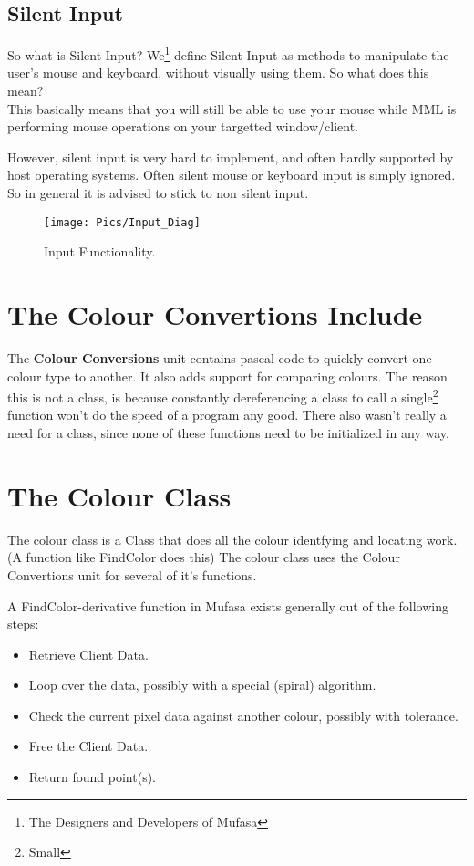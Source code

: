 \documentclass[a4paper, 10pt]{report} %
\begin{document}
\subsection{Silent Input}

So what is Silent Input?
We\footnote{The Designers and Developers of Mufasa} define Silent Input as
methods to manipulate the user's mouse and keyboard, without visually using
them. So what does this mean? \\

This basically means that you will still be able to use your mouse while
MML is performing mouse operations on your targetted window/client.

However, silent input is very hard to implement, and often hardly supported
by host operating systems. Often silent mouse or keyboard input is simply 
ignored. So in general it is advised to stick to non silent input.


\begin{figure}[ht]
	\texttt{[image: Pics/Input\_Diag]}
	\caption{Input Functionality.}
\end{figure}

\section{The Colour Convertions Include}

The \textbf{Colour Conversions} unit contains pascal code to quickly convert
one colour type to another. It also adds support for comparing colours.
The reason this is not a class, is because constantly dereferencing a class
to call a single\footnote{Small} function won't do the speed of a program any 
good. There also wasn't really a need for a class,
since none of these functions need to be initialized in any way.

\section{The Colour Class}

The colour class is a Class that does all the colour identfying and locating
work. (A function like FindColor does this)
The colour class uses the Colour Convertions unit for several of it's
functions.

A FindColor-derivative function in Mufasa exists generally out of the following
steps:
\begin{itemize}
	\item Retrieve Client Data.
	\item Loop over the data, possibly with a special (spiral) algorithm.
	\item Check the current pixel data against another colour, possibly 
		  with tolerance.
	\item Free the Client Data.
	\item Return found point(s).
\end{itemize}
\end{document}
